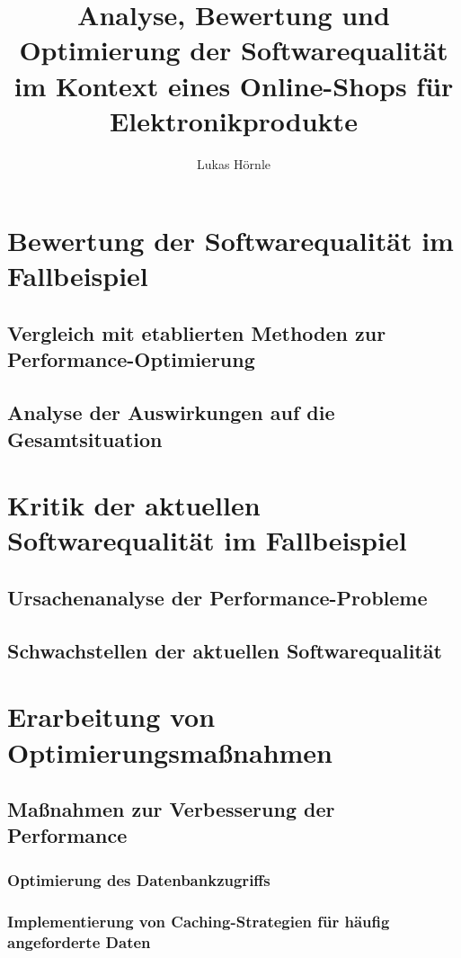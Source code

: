 \documentclass{article}
\begin{document}
\title{Analyse, Bewertung und Optimierung der Softwarequalität im Kontext eines Online-Shops für Elektronikprodukte}
\author{Lukas Hörnle}
\maketitle

\tableofcontents
\newpage





\section{Bewertung der Softwarequalität im Fallbeispiel}
\subsection{Vergleich mit etablierten Methoden zur Performance-Optimierung}
\subsection{Analyse der Auswirkungen auf die Gesamtsituation}

\section{Kritik der aktuellen Softwarequalität im Fallbeispiel}
\subsection{Ursachenanalyse der Performance-Probleme}
\subsection{Schwachstellen der aktuellen Softwarequalität}

\section{Erarbeitung von Optimierungsmaßnahmen}
\subsection{Maßnahmen zur Verbesserung der Performance}
\subsubsection{Optimierung des Datenbankzugriffs}
\subsubsection{Implementierung von Caching-Strategien für häufig angeforderte Daten}
\end{document}

